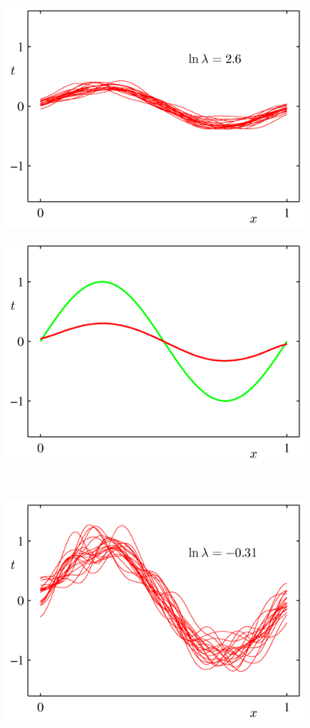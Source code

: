 \documentclass[b5paper]{book}
\numberwithin{equation}{chapter}
\begin{document}
{\begin{figure}[H]
\begin{minipage}[t]{0.5\linewidth}
		\includegraphics[scale=0.8]{Images/3-5a.png}
		\label{fig:3-5a}
		\end{minipage}
		\begin{minipage}[t]{0.5\linewidth}
		\centering
		\includegraphics[scale=0.8]{Images/3-5b.png}
		\label{fig:3-5b}
		\end{minipage}\\
		\begin{minipage}[t]{0.5\linewidth}
		\centering
		\includegraphics[scale=0.8]{Images/3-5c.png}

\end{minipage}
\end{figure}}
\end{document}
